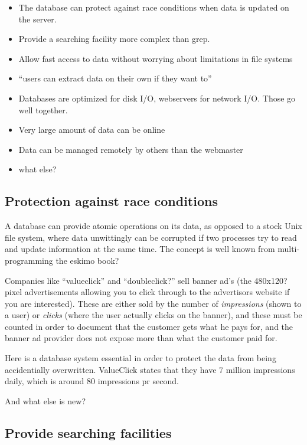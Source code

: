 \documentclass[draft,a4paper]{book}
\begin{document}
\begin{itemize}
\item The database can protect against race conditions when data is
  updated on the server.
\item Provide a searching facility more complex than grep.
\item Allow fast access to data without worrying about limitations in
  file systems
\item ``\textsf{users can extract data on their own if they want to}''
\item Databases are optimized for disk I/O, webservers for network
  I/O.  Those go well together.
\item Very large amount of data can be online
\item Data can be managed remotely by others than the webmaster
\item \textsf{what else?}
\end{itemize}


\subsection{Protection against race conditions}
\label{sec:protection-against-race-conditions}

A database can provide atomic operations on its data, as opposed to a
stock Unix file system, where data unwittingly can be corrupted if two
processes try to read and update information at the same time.  The
concept is well known from multi-programming \textsf{the eskimo book?}

Companies like ``valueclick'' and ``\textsf{doubleclick?}'' sell
banner ad's (the \textsf{480x120?} pixel advertisements allowing you
to click through to the advertisors website if you are interested).
These are either sold by the number of \textit{impressions} (shown to a
user) or \textit{clicks} (where the user actually clicks on the
banner), and these must be counted in order to document that the
customer gets what he pays for, and the banner ad provider does not
expose more than what the customer paid for.

Here is a database system essential in order to protect the data from
being accidentially overwritten.  ValueClick states that they have
\textsf{7 million impressions}  daily, which is around 80
impressions pr second.

\textsf{And what else is new?}

\subsection{Provide searching facilities}
\label{sec:providing-searching-facilities}
\end{document}
